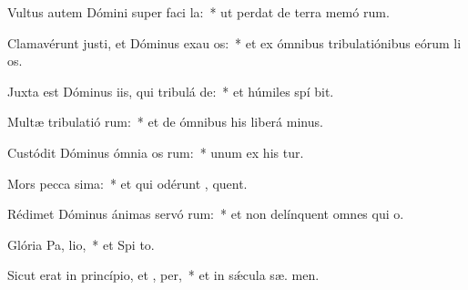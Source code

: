 \item Vultus autem Dómini super faci la:~* ut perdat de terra memó rum.
\item Clamavérunt justi, et Dóminus exau os:~* et ex ómnibus tribulatiónibus eórum li os.
\item Juxta est Dóminus iis, qui tribulá  de:~* et húmiles spí bit.
\item Multæ tribulatió rum:~* et de ómnibus his liberá  minus.
\item Custódit Dóminus ómnia os rum:~* unum ex his  tur.
\item Mors pecca sima:~* et qui odérunt , quent.
\item Rédimet Dóminus ánimas servó rum:~* et non delínquent omnes qui   o.
\item Glória Pa,  lio,~* et Spi to.
\item Sicut erat in princípio, et ,  per,~* et in sǽcula sæ. men.
